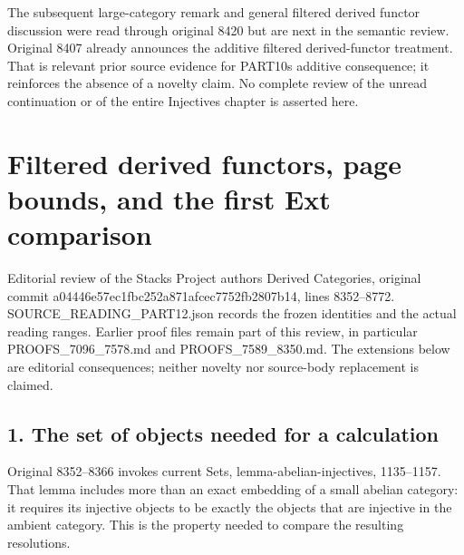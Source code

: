 \documentclass[11pt]{article}
\begin{document}
The subsequent large-category remark and general filtered derived functor discussion were read through original 8420 but are next in the semantic review. Original 8407 already announces the additive filtered derived-functor treatment. That is relevant prior source evidence for PART10\textquotesingle s additive consequence; it reinforces the absence of a novelty claim. No complete review of the unread continuation or of the entire Injectives chapter is asserted here.
\clearpage
\section{\texorpdfstring{Filtered derived functors,\allowbreak{} page bounds,\allowbreak{} and the first Ext comparison}{Filtered derived  page  and the first Ext comparison}}\label{proofs-8352-8772-filtered-derived-functors-page-bounds-and-the-first-ext-comparison}

Editorial review of the Stacks Project authors\textquotesingle{} Derived Categories,\allowbreak{} original commit a04446e5\allowbreak{}7ec1fbc2\allowbreak{}52a871af\allowbreak{}cec7752f\allowbreak{}b2807b14, lines 8352–\allowbreak{}8772. SOURCE\_\allowbreak{}READING\_\allowbreak{}PART12.json records the frozen identities and the actual reading ranges. Earlier proof files remain part of this review,\allowbreak{} in particular PROOFS\_\allowbreak{}7096\_\allowbreak{}7578.md and PROOFS\_\allowbreak{}7589\_\allowbreak{}8350.md. The extensions below are editorial consequences; neither novelty nor source-body replacement is claimed.

\subsection{1. The set of objects needed for a calculation}\label{proofs-8352-8772-the-set-of-objects-needed-for-a-calculation}

Original 8352–\allowbreak{}8366 invokes current Sets,\allowbreak{} lemma-abelian-injectives,\allowbreak{} 1135–\allowbreak{}1157. That lemma includes more than an exact embedding of a small abelian category:\allowbreak{} it requires its injective objects to be exactly the objects that are injective in the ambient category. This is the property needed to compare the resulting resolutions.
\end{document}
